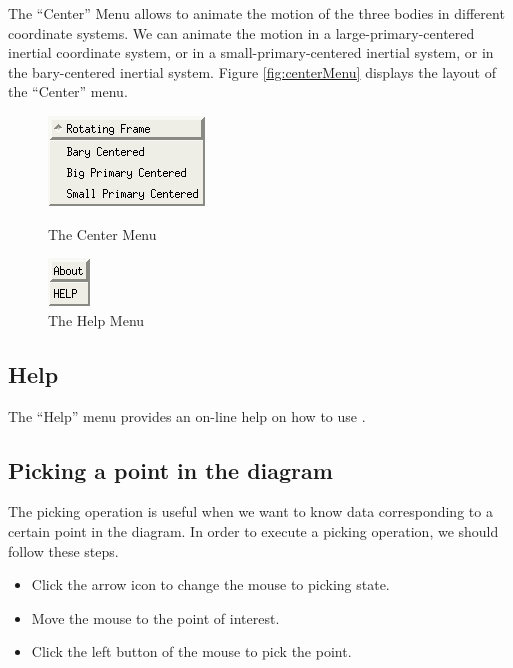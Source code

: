 The ``Center'' Menu allows to animate the motion of the three bodies in different
coordinate systems. We can animate the motion in a large-primary-centered inertial 
coordinate system, or in a small-primary-centered inertial system, or in the bary-centered
inertial system. Figure \ref{fig:centerMenu} displays the layout of the ``Center'' menu. 

\begin{figure}[!htmb]
\centering
    \begin{minipage}[b]{0.5\textwidth}
        \centering
        \includegraphics {./include/centerMenu}
        \caption{The Center Menu} \label{fig:centerMenu}
    \end{minipage}%
    \begin{minipage}[b]{0.5\textwidth}
        \centering
        \includegraphics {./include/helpMenu}
        \caption{The Help Menu} \label{fig:helpMenu}
    \end{minipage}
\end{figure}


\subsection{Help}

The ``Help'' menu provides an on-line help on how to use \PLAUT.

\subsection{Picking a point in the diagram}

The picking operation is useful when we want to know data corresponding to a certain
point in the diagram. In order to execute a picking operation, we should follow these steps.
\begin{itemize}
	\item Click the arrow icon to change the mouse to picking state. 
    \item Move the mouse to the point of interest.
	\item Click the left button of the mouse to pick the point.
\end{itemize}


